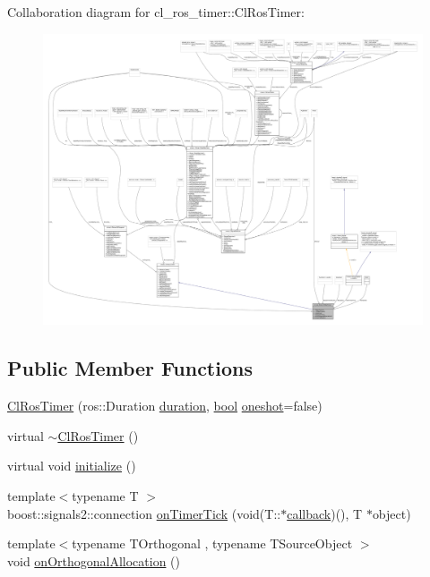 Collaboration diagram for cl\+\_\+ros\+\_\+timer\+:\+:Cl\+Ros\+Timer\+:
\nopagebreak
\begin{figure}[H]
\begin{center}
\leavevmode
\includegraphics[width=350pt]{classcl__ros__timer_1_1ClRosTimer__coll__graph}
\end{center}
\end{figure}
\subsection*{Public Member Functions}
\begin{DoxyCompactItemize}
\item 
\hyperlink{classcl__ros__timer_1_1ClRosTimer_afd99658be9585d467a05238a2dd604da}{Cl\+Ros\+Timer} (ros\+::\+Duration \hyperlink{classcl__ros__timer_1_1ClRosTimer_a39a5666044409eca94562fcceca8b0ea}{duration}, \hyperlink{classbool}{bool} \hyperlink{classcl__ros__timer_1_1ClRosTimer_a07ce4ac2560aa7ad4b5dee233f2d7733}{oneshot}=false)
\item 
virtual \hyperlink{classcl__ros__timer_1_1ClRosTimer_a94a600197795e0235e86461a90c8cd7d}{$\sim$\+Cl\+Ros\+Timer} ()
\item 
virtual void \hyperlink{classcl__ros__timer_1_1ClRosTimer_a874e97a9e3e974966ac4999e0a293e73}{initialize} ()
\item 
{\footnotesize template$<$typename T $>$ }\\boost\+::signals2\+::connection \hyperlink{classcl__ros__timer_1_1ClRosTimer_a7edcc057bfb5a25fe0892755137dd8da}{on\+Timer\+Tick} (void(T\+::$\ast$\hyperlink{sm__ridgeback__barrel__search__2_2servers_2opencv__perception__node_2opencv__perception__node_8cpp_a050e697bd654facce10ea3f6549669b3}{callback})(), T $\ast$object)
\item 
{\footnotesize template$<$typename T\+Orthogonal , typename T\+Source\+Object $>$ }\\void \hyperlink{classcl__ros__timer_1_1ClRosTimer_a750d57fbbdb9db5a2382ee6180fd7700}{on\+Orthogonal\+Allocation} ()
\end{DoxyCompactItemize}
